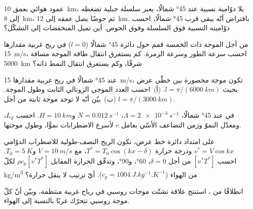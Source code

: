 \begin{exercise}[$\star\star$]\label{exo:b3:atmospheric-dynamics:5}
عمود هوائي بعمق \qty{10}{km}، بلا دوّامية نسبية عند \ang{45}
شمالًا، يعبر سلسلة جبلية تضغطه إلى \qty{8}{km}، ثم حوضًا يصل عمقه إلى
\qty{12}{km}. بافتراض أنّه يبقى قرب \ang{45} شمالًا، احسب دوّاميته النسبية
فوق السلسلة وفوق الحوض. أين تميل المنخفضات
إلى التشكّل؟
\end{exercise}

\begin{exercise}[$\star\star$]\label{exo:b3:atmospheric-dynamics:6}
من أجل الموجة ذات الخمسة قمم حول دائرة \ang{45} شمالًا ($l = 0$) في
ريح غربية مقدارها \qty{15}{m/s}، احسب سرعة الطور وسرعة الزمرة.
كم يستغرق انتقال طاقة الموجة مسافة \qty{5000}{km} شرقًا، وكم
يستغرق انتقال النمط ذاته؟
\end{exercise}

\begin{exercise}[$\star\star$]\label{exo:b3:atmospheric-dynamics:7}
عند \ang{45} شمالًا في ريح غربية مقدارها \qty{15}{m/s}، تكون موجة محصورة بين
خطّي عرض بحيث $l = \pi/(\qty{6000}{km})$. (أ)~احسب العدد الموجي الزونالي الثابت
وطول الموجة. (ب)~بيّن أنّه لا توجد موجة ثابتة من أجل
$l = \pi/(\qty{3000}{km})$.
\end{exercise}

\begin{exercise}[$\star\star$]\label{exo:b3:atmospheric-dynamics:8}
في  عند \ang{45} شمالًا، $\Lambda = \qty{2e-3}{s^{-1}}$، $N =
\qty{0.012}{s^{-1}}$ و$H = \qty{10}{km}$. احسب $L_d$، ومعدّل النموّ
وزمن التضاعف الأسّي بعامل $e$ لأسرع الاضطرابات نموًّا، وطول
موجتها.
\end{exercise}

\begin{exercise}[$\star\star$]\label{exo:b3:atmospheric-dynamics:9}
على امتداد دائرة خط عرض، تكون الريح النصف-طولية للاضطراب الدوّامي $v^* = V\cos kx$
ودرجة حرارة  $T^* = T_0\cos(kx - \delta)$، مع $V = \qty{10}{m/s}$
و$T_0 = \qty{5}{K}$. احسب $[v^*T^*]$ من أجل $\delta = 0$، \ang{60}،
و\ang{90}، وتدفّق الحرارة المقابل $\rho c_p[v^*T^*]$ لكلّ
\unit{kg/m^3} من الهواء ($c_p = \qty{1004}{J.kg^{-1}.K^{-1}}$). أيّ
ترتيب لا ينقل حرارة؟
\end{exercise}

\begin{exercise}[$\star\star\star$]\label{exo:b3:atmospheric-dynamics:10}
انطلاقًا من ، استنتج علاقة تشتّت موجات روسبي
في رياح غربية منتظمة، وبيّن أنّ كلّ موجة روسبي تتحرّك غربًا
بالنسبة إلى الهواء.
\end{exercise}

